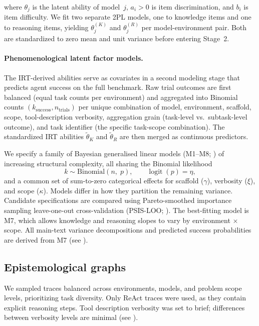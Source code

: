 where $\theta_j$ is the latent ability of model~$j$, $a_i > 0$ is item discrimination, and $b_i$ is item difficulty. We fit two separate 2PL models, one to knowledge items and one to reasoning items, yielding $\theta_j^{(K)}$ and $\theta_j^{(R)}$ per model-environment pair. Both are standardized to zero mean and unit variance before entering Stage~2.

\paragraph{Phenomenological latent factor models.}
The IRT-derived abilities serve as covariates in a second modeling stage that predicts agent success on the full benchmark. Raw trial outcomes are first balanced (equal task counts per environment) and aggregated into Binomial counts $(k_{\text{success}}, n_{\text{trials}})$ per unique combination of model, environment, scaffold, scope, tool-description verbosity, aggregation grain (task-level vs.\ subtask-level outcome), and task identifier (the specific task-scope combination). The standardized IRT abilities $\tilde{\theta}_K$ and $\tilde{\theta}_R$ are then merged as continuous predictors.

We specify a family of Bayesian generalised linear models \autocite{edition2013bayesian} (M1--M8; ) of increasing structural complexity, all sharing the Binomial likelihood
  \begin{equation}
    k \sim \mathrm{Binomial}(n,\; p), \qquad
    \operatorname{logit}(p) = \eta,
    \label{eq:lfm_likelihood}
  \end{equation}
and a common set of sum-to-zero categorical effects for scaffold ($\gamma$), verbosity ($\xi$), and scope ($\kappa$). Models differ in how they partition the remaining variance. Candidate specifications are compared using Pareto-smoothed importance sampling leave-one-out cross-validation (PSIS-LOO; ). The best-fitting model is M7, which allows knowledge and reasoning slopes to vary by environment $\times$ scope. All main-text variance decompositions and predicted success probabilities are derived from M7 (see ).


\subsection{Epistemological graphs} \label{sec:epistemological-graphs}

We sampled traces balanced across environments, models, and problem scope levels, prioritizing task diversity. Only ReAct traces were used, as they contain explicit reasoning steps. Tool description verbosity was set to brief; differences between verbosity levels are minimal (see ).

